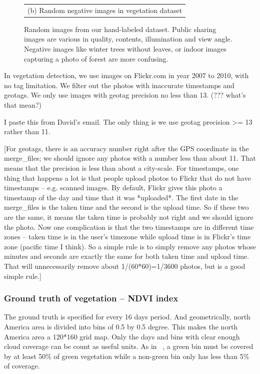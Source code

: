 \begin{figure}[th]
{{\begin{center}
\begin{tabular}{@{}c@{\,\,\,}c@{\,\,\,}c@{\,\,\,}c@{\,\,\,}c@{\,\,\,}}
\multicolumn{5}{c}{(b) Random negative images in vegetation dataset} \\
\end{tabular}
\end{center}
}}
\caption{Random images from our hand-labeled dataset. Public sharing images are various in quality, contents, illumination and view angle.
Negative images like winter trees without leaves, or indoor images capturing a photo of forest are more confusing.}
\label{fig:dataset}
\end{figure}




In vegetation detection, we use images on Flickr.com in year 2007 to 2010, with no tag limitation. We filter out the photos with inaccurate timestamps and geotags. We only use images with geotag precision no less than 13. (??? what's that mean?) 

I paste this from David's email. The only thing is we use geotag precision >= 13 rather than 11. 

[For geotags, there is an
accuracy number right after the GPS coordinate in the merge\_files; we
should ignore any photos with a number less than about 11. That means
that the precision is less than about a city-scale. For timestamps,
one thing that happens a lot is that people upload photos to Flickr
that do not have timestamps -- e.g. scanned images. By default, Flickr
gives this photo a timestamp of the day and time that it was
*uploaded*. The first date in the merge\_files is the taken time and
the second is the upload time. So if these two are the same, it means
the taken time is probably not right and we should ignore the photo.
Now one complication is that the two timestamps are in different time
zones -- taken time is in the user's timezone while upload time is in
Flickr's time zone (pacific time I think). So a simple rule is to
simply remove any photos whose minutes and seconds are exactly the
same for both taken time and upload time. That will unnecessarily
remove about 1/(60*60)=1/3600 photos, but is a good simple rule.]




\subsubsection*{Ground truth of vegetation -- NDVI index}
The ground truth is specified for every 16 days period. 
And geometrically, north America area is divided into bins of 0.5 by 0.5 degree. This makes the north America area a 120*160 grid map.
Only the days and bins with clear enough cloud coverage can be count as useful units. As in ~\cite{www paper}, a green bin must be covered by at least 50\% of green vegetation while a non-green bin only has less than 5\% of coverage.


